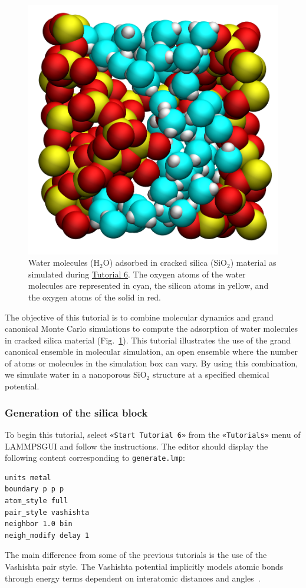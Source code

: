 \documentclass[9pt,tutorial]{livecoms}
\newcommand{\lmpcmd}[1]{\colorbox{listing}{\textcolor{command}{\small{#1}}}} %
\newcommand{\flecmd}[1]{\textcolor{command}{\texttt{#1}}} %
\newcommand{\guicmd}[1]{\textcolor{command}{\texttt{«#1»}}} %
\newcommand{\lammpsgui}{\textsf{LAMMPS\textendash GUI}}
\begin{document}
\begin{figure}
\centering
\includegraphics[width=0.6\linewidth]{GCMC}
\caption{Water molecules (H$_2$O) adsorbed in cracked silica (SiO$_2$) material as simulated
during \hyperref[gcmc-silica-label]{Tutorial 6}.  The oxygen atoms of the water
molecules are represented in cyan, the silicon atoms in yellow, and the oxygen
atoms of the solid in red.}
\label{fig:GCMC}
\end{figure}

\noindent The objective of this tutorial is to combine molecular dynamics and
grand canonical Monte Carlo simulations to compute the adsorption of water
molecules in cracked silica material (Fig.~\ref{fig:GCMC}).  This tutorial
illustrates the use of the grand canonical ensemble in molecular simulation, an
open ensemble where the number of atoms or molecules in the simulation box can vary.
By using this combination, we simulate water in a nanoporous
SiO$_2$ structure at a specified chemical potential.

\subsubsection{Generation of the silica block}

To begin this tutorial, select \guicmd{Start Tutorial 6} from the
\guicmd{Tutorials} menu of \lammpsgui{} and follow the instructions.
The editor should display the following content corresponding to \flecmd{generate.lmp}:
\begin{lstlisting}
units metal
boundary p p p
atom_style full
pair_style vashishta
neighbor 1.0 bin
neigh_modify delay 1
\end{lstlisting}
The main difference from some of the previous tutorials is the use of the \lmpcmd{Vashishta}
pair style.  The Vashishta potential implicitly models atomic bonds through
energy terms dependent on interatomic distances and angles~\cite{vashishta1990interaction}.
\end{document}
